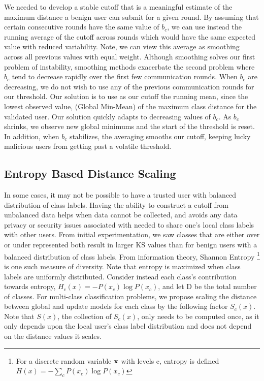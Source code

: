 \documentclass{article} %
\begin{document}
We needed to develop a stable cutoff that is a meaningful estimate of the maximum distance a benign user can submit for a given round. By assuming that certain consecutive rounds have the same value of $b_c$, we can use instead the running average of the cutoff across rounds which would have the same expected value with reduced variability. Note, we can view this average as smoothing across all previous values with equal weight. Although smoothing solves our first problem of instability, smoothing methods exacerbate the second problem where $b_c$ tend to decrease rapidly over the first few communication rounds. When $b_c$ are decreasing, we do not wish to use any of the previous communication rounds for our threshold. Our solution is to use as our cutoff the running mean, since the lowest observed value, (Global Min-Mean) of the maximum class distance for the validated user. Our solution quickly adapts to decreasing values of $b_c$. As $b_c$ shrinks, we observe new global minimums and the start of the threshold is reset. In addition, when $b_c$ stabilizes, the averaging smooths our cutoff, keeping lucky malicious users from getting past a volatile threshold.

%
\subsection{Entropy Based Distance Scaling}

In some cases, it may not be possible to have a trusted user with balanced distribution of class labels. Having the ability to construct a cutoff from unbalanced data helps when data cannot be collected, and avoids any data privacy or security issues associated with needed to share one's local class labels with other users. From initial experimentation, we saw classes that are either over or under represented both result in larger KS values than for benign users with a balanced distribution of class labels. From information theory, Shannon Entropy \footnote{For a discrete random variable ${\mathbf{x}}$ with levels c, entropy is defined $H(x) = - \sum_c P(x_c) \log P(x_c)$} is one such measure of diversity. Note that entropy is maximized when class labels are uniformly distributed. Consider instead each class's contribution towards entropy, $H_c(x) = - P(x_c) \log P(x_c)$, and let D be the total number of classes. For multi-class classification problems, we propose scaling the distance between global and update models for each class by the following factor $S_c(x)$. Note that $S(x)$, the collection of $S_c(x)$, only needs to be computed once, as it only depends upon the local user's class label distribution and does not depend on the distance values it scales.
\end{document}
